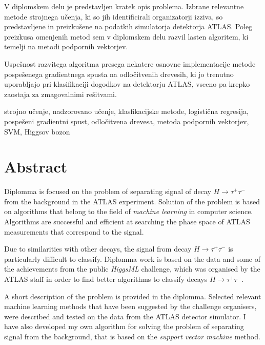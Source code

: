 V diplomskem delu je predstavljen kratek opis problema. Izbrane relevantne metode strojnega učenja, ki so jih identificirali organizatorji izziva, so predstavljene in preizkušene na podatkih simulatorja detektorja ATLAS. Poleg preizkusa omenjenih metod sem v diplomskem delu razvil lasten algoritem, ki temelji na metodi podpornih vektorjev.

Uspešnost razvitega algoritma presega nekatere osnovne implementacije metode pospešenega gradientnega spusta na odločitvenih drevesih, ki jo trenutno uporabljajo pri klasifikaciji dogodkov na detektorju ATLAS, vseeno pa krepko zaostaja za zmagovalnimi rešitvami.


\vspace{1.3cm}


\vspace{0.1cm}
\noindent strojno učenje, nadzorovano učenje, klasfikacijske metode, logistična regresija, pospešeni gradientni spust, odločitvena drevesa, metoda podpornih vektorjev, SVM, Higgsov bozon

\chapter*{Abstract}
\vspace{1.3cm}
\noindent Diplomma is focused on the problem of separating signal of decay $H \rightarrow \tau^+\tau^-$  from the background in the ATLAS experiment. Solution of the problem is based on algorithms that belong to the field of \textit{machine learning} in  computer science. Algorithms are successful and efficient at searching the phase space of ATLAS measurements that correspond to the signal.

Due to similarities with other decays, the signal from decay $H \rightarrow \tau^+\tau^-$ is particularly difficult to classify. Diplomma work is based on the data and some of the achievements from the public \textit{HiggsML} challenge, which was organised by the ATLAS staff in order to find better algorithms to classify decays $H \rightarrow \tau^+\tau^-$.

A short description of the problem is provided in the diplomma. Selected relevant machine learning methods that have been suggested by the challenge organisers, were described and tested on the data from the ATLAS detector simulator. I have also developed my own algorithm for solving the problem of separating signal from the background, that is based on the \textit{support vector machine} method.

